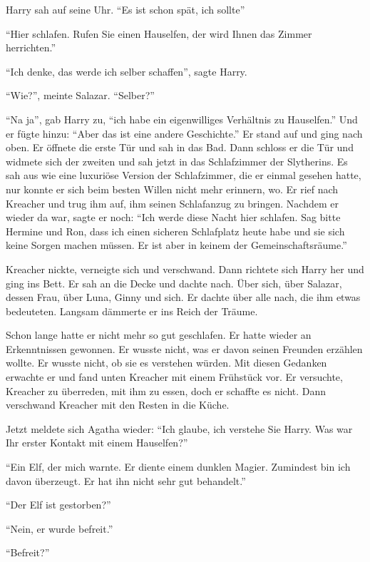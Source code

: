 Harry sah auf seine Uhr. \enquote{Es ist schon spät, ich sollte\abs}

\enquote{Hier schlafen. Rufen Sie einen Hauselfen, der wird Ihnen das Zimmer herrichten.}

\enquote{Ich denke, das werde ich selber schaffen}, sagte Harry.

\enquote{Wie?}, meinte Salazar. \enquote{Selber?}

\enquote{Na ja}, gab Harry zu, \enquote{ich habe ein eigenwilliges Verhältnis zu Hauselfen.} Und er fügte hinzu: \enquote{Aber das ist eine andere Geschichte.} Er stand auf und ging nach oben. Er öffnete die erste Tür und sah in das Bad. Dann schloss er die Tür und widmete sich der zweiten und sah jetzt in das Schlafzimmer der Slytherins. Es sah aus wie eine luxuriöse Version der Schlafzimmer, die er einmal gesehen hatte, nur konnte er sich beim besten Willen nicht mehr erinnern, wo. Er rief nach Kreacher und trug ihm auf, ihm seinen Schlafanzug zu bringen. Nachdem er wieder da war, sagte er noch: \enquote{Ich werde diese Nacht hier schlafen. Sag bitte Hermine und Ron, dass ich einen sicheren Schlafplatz heute habe und sie sich keine Sorgen machen müssen. Er ist aber in keinem der Gemeinschaftsräume.}

Kreacher nickte, verneigte sich und verschwand. Dann richtete sich Harry her und ging ins Bett. Er sah an die Decke und dachte nach. Über sich, über Salazar, dessen Frau, über Luna, Ginny und sich. Er dachte über alle nach, die ihm etwas bedeuteten. Langsam dämmerte er ins Reich der Träume.

Schon lange hatte er nicht mehr so gut geschlafen. Er hatte wieder an Erkenntnissen gewonnen. Er wusste nicht, was er davon seinen Freunden erzählen wollte. Er wusste nicht, ob sie es verstehen würden. Mit diesen Gedanken erwachte er und fand unten Kreacher mit einem Frühstück vor. Er versuchte, Kreacher zu überreden, mit ihm zu essen, doch er schaffte es nicht. Dann verschwand Kreacher mit den Resten in die Küche.

Jetzt meldete sich Agatha wieder: \enquote{Ich glaube, ich verstehe Sie Harry. Was war Ihr erster Kontakt mit einem Hauselfen?}

\enquote{Ein Elf, der mich warnte. Er diente einem dunklen Magier. Zumindest bin ich davon überzeugt. Er hat ihn nicht sehr gut behandelt.}

\enquote{Der Elf ist gestorben?}

\enquote{Nein, er wurde befreit.}

\enquote{Befreit?}

